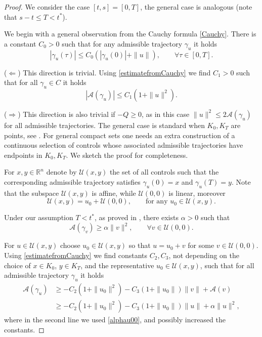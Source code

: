 \documentclass[reqno]{amsart}
\theoremstyle{plain}
\theoremstyle{definition}
\theoremstyle{remark}
\newcommand{\R}{\mathbb{R}}
\begin{document}
\begin{proof} We consider the case $[t,s]=[0,T]$, the general case is analogous (note that $s-t\leq T < t^*$).

We begin with a general observation from the Cauchy formula \eqref{Cauchy}. There is a constant $C_0>0$ such that for any admissible trajectory $\gamma_u$ it holds
\begin{equation}\label{estimatefromCauchy}
|\gamma_u(\tau)| \leq C_0 \left( |\gamma_u(0)| + \|u\|\right),\qquad \forall \tau\in [0,T].
\end{equation}

($\Leftarrow$) This direction is trivial. Using \eqref{estimatefromCauchy} we find $C_1>0$ such that for all $\gamma_u\in C$ it holds
\begin{equation}
   | \mathcal{A}(\gamma_u) |\leq C_1(1+\|u\|^2).
\end{equation}

($\Rightarrow$) This direction is also trivial if $-Q\geq 0$, as in this case $\|u\|^2\leq 2\mathcal{A}(\gamma_u)$ for all admissible trajectories. The general case is standard when $K_0, K_T$ are points, see \cite[Proof of Proposition 16.1]{agrachev2013control}. For general compact sets one needs an extra construction of a continuous selection of controls whose associated admissible trajectories have endpoints in $K_0, K_T$. We sketch the proof for completeness.

For $x,y\in\R^n$ denote by $\mathcal{U}(x,y)$ the set of all controls such that the corresponding admissible trajectory satisfies $\gamma_u(0)=x$ and $\gamma_u(T)=y$. Note that the subspace $\mathcal{U}(x,y)$ is affine, while $\mathcal{U}(0,0)$ is linear, moreover
\begin{equation}
    \mathcal{U}(x,y)=u_0 +\mathcal{U}(0,0),\qquad \text{for any }u_0\in\mathcal{U}(x,y).
\end{equation}

Under our assumption $T<t^*$, as proved in \cite[Section 16.4]{agrachev2013control}, there exists $\alpha>0$ such that
\begin{equation}\label{alphau00}
\mathcal{A}(\gamma_v) \geq \alpha \|v\|^2,\qquad \forall v \in \mathcal{U}(0,0).
\end{equation}


For $u\in \mathcal{U}(x,y)$ choose $u_{0}\in\mathcal{U}(x,y)$ so that $u=u_0+v$ for some $v\in\mathcal{U}(0,0)$. Using \eqref{estimatefromCauchy} we find constants $C_2,C_3$, not depending on the choice of $x \in K_0$, $y\in K_T$, and the representative $u_0\in \mathcal{U}(x,y)$, such that for all admissible trajectory $\gamma_u$ it holds
\begin{align}
\mathcal{A}(\gamma_u) & \geq -C_2(1+\|u_0\|^2) - C_3(1+\|u_0\|)\|v\|+ \mathcal{A}(v)  \\
& \geq  -C_2(1+\|u_0\|^2) - C_3(1+\|u_0\|)\|u\| +\alpha \|u\|^2, \label{eq:estimate1}
\end{align}
where in the second line we used \eqref{alphau00}, and possibly increased the constants.


\end{proof}
\end{document}
